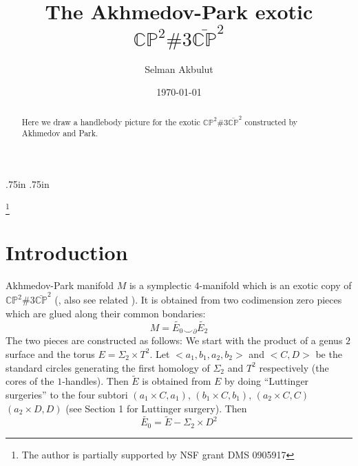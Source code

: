 \documentclass[11pt]{amsart}
\begin{document}
\textwidth 6.2in
\textheight 7.6in
\evensidemargin .75in
\oddsidemargin.75in

\newtheorem{Thm}{Theorem}
\newtheorem{Lem}[Thm]{Lemma}
\newtheorem{Cor}[Thm]{Corollary}
\newtheorem{Prop}[Thm]{Proposition}
\newtheorem{Rm}{Remark}

\title{The Akhmedov-Park exotic  ${{{\mathbb C}}{{\mathbb P}}}^{2}\#3\bar{{{\mathbb C}}{{\mathbb P}}}^2$}
\author{Selman Akbulut}
\thanks{The author is partially supported by NSF grant DMS 0905917}
\keywords{}
\address{Department  of Mathematics, Michigan State University,  MI, 48824}
\date{\today}
\begin{abstract} 
Here we draw a handlebody picture for the exotic ${{{\mathbb C}}{{\mathbb P}}}^{2}\#3\bar{{{\mathbb C}}{{\mathbb P}}}^2$ constructed by Akhmedov and Park.

\end{abstract}

\date{}
\maketitle

\setcounter{section}{-1}

\vspace{-.35in}

\section{Introduction}

Akhmedov-Park manifold $M$ is a symplectic $4$-manifold which is an exotic copy of ${{{\mathbb C}}{{\mathbb P}}}^{2}\#3\bar{{{\mathbb C}}{{\mathbb P}}}^2$ (\cite{ap}, also see related \cite{ak}). It is  obtained from two codimension zero pieces  which are glued along their common bondaries: $$M=\tilde{E_{0}}\smile_{\partial} \tilde{E_{2}}$$ The two pieces are constructed as follows:  We start with the product of a genus $2$ surface and the torus $E = \Sigma_{2}\times T^{2}$. Let $<a_1,b_1,a_2,b_2>$ and $<C,D >$ be the standard circles generating the first homology of $\Sigma_{2}$ and $T^{2}$ respectively (the cores of the $1$-handles). Then $\tilde{E}$ is obtained from $E$ by doing ``Luttinger surgeries'' to the four subtori $(a_1\times C, a_1)$, $(b_1\times C, b_1)$,   $(a_2 \times C, C)$  $(a_2 \times D, D)$ (see Section 1 for Luttinger surgery).  Then
$$\tilde{E_{0}}=\tilde{E}- \Sigma_{2}\times D^2$$
\end{document}
